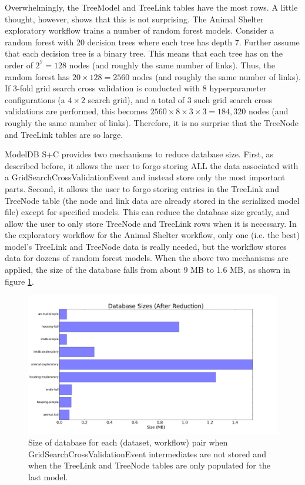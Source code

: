 Overwhelmingly, the TreeModel and TreeLink tables have the most rows. A little
thought, however, shows that this is not surprising. The Animal Shelter exploratory workflow
trains a number of random forest models. Consider
a random forest with 20 decision trees where each tree has depth 7. Further assume
that each decision tree is a binary tree. This means that each tree has on the
order of $2^{7} = 128$ nodes (and roughly the same number of links). Thus, the
random forest has $20 \times 128 = 2560$ nodes (and roughly the same number of links).
If 3-fold grid search cross validation is conducted with 8 hyperparameter configurations (a $4 \times 2$ 
search grid), and a total of 3 such grid search cross validations are performed, 
this becomes $2560 \times 8 \times 3 \times 3 = 184,320$ nodes (and roughly the same number of links).
Therefore, it is no surprise that the TreeNode and TreeLink tables are so large.

ModelDB S+C provides two mechanisms to reduce database size. First, as described before, it
allows the user to forgo storing ALL the data associated with a GridSearchCrossValidationEvent and instead
store only the most important parts.
Second, it allows the user to forgo storing entries in the TreeLink and TreeNode table (the
node and link data are already stored in the serialized model file) except for specified models. This can reduce the database size
greatly, and allow the user to only store TreeNode and TreeLink rows when it is necessary. In the 
exploratory workflow for the Animal Shelter workflow, only one (i.e. the best)  model's TreeLink and TreeNode data is really needed,
but the workflow stores data for dozens of random forest models. When the above two mechanisms are applied,
the size of the database falls from about 9 MB to 1.6 MB, as shown in figure \ref{fig:dbsize_small}.

\begin{figure}
  \centering
  \includegraphics[width=6.0in]{dbsize_small}
  \caption{
    Size of database for each (dataset, workflow) pair when GridSearchCrossValidationEvent intermediates
    are not stored and when the TreeLink and TreeNode tables are only populated for the last model.
  }
  \label{fig:dbsize_small}
\end{figure}


